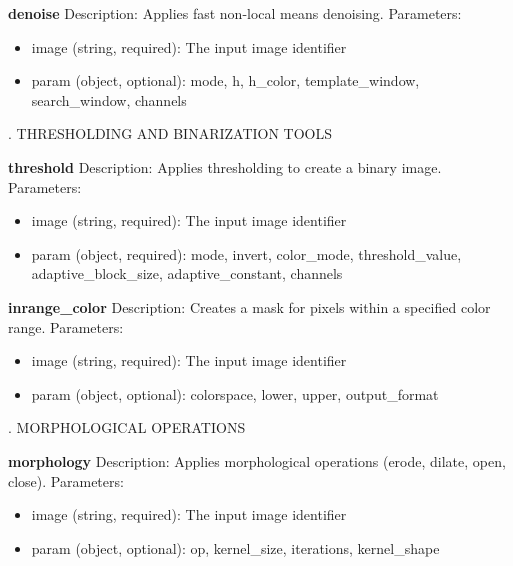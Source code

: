 \documentclass[runningheads]{llncs}
\begin{document}
\begin{tcolorbox}
\noindent \textbf{denoise}
\newline Description: Applies fast non-local means denoising.
\newline Parameters:
\begin{itemize}
    \item image (string, required): The input image identifier
    \item param (object, optional): mode, h, h\_color, template\_window, search\_window, channels
\end{itemize}

\vspace{4mm}
. THRESHOLDING AND BINARIZATION TOOLS
\vspace{2mm}

\noindent \textbf{threshold}
\newline Description: Applies thresholding to create a binary image.
\newline Parameters:
\begin{itemize}
    \item image (string, required): The input image identifier
    \item param (object, required): mode, invert, color\_mode, threshold\_value, adaptive\_block\_size, adaptive\_constant, channels
\end{itemize}

\noindent \textbf{inrange\_color}
\newline Description: Creates a mask for pixels within a specified color range.
\newline Parameters:
\begin{itemize}
    \item image (string, required): The input image identifier
    \item param (object, optional): colorspace, lower, upper, output\_format
\end{itemize}

\vspace{4mm}
. MORPHOLOGICAL OPERATIONS
\vspace{2mm}

\noindent \textbf{morphology}
\newline Description: Applies morphological operations (erode, dilate, open, close).
\newline Parameters:
\begin{itemize}
    \item image (string, required): The input image identifier
    \item param (object, optional): op, kernel\_size, iterations, kernel\_shape
\end{itemize}


\end{tcolorbox}
\end{document}
